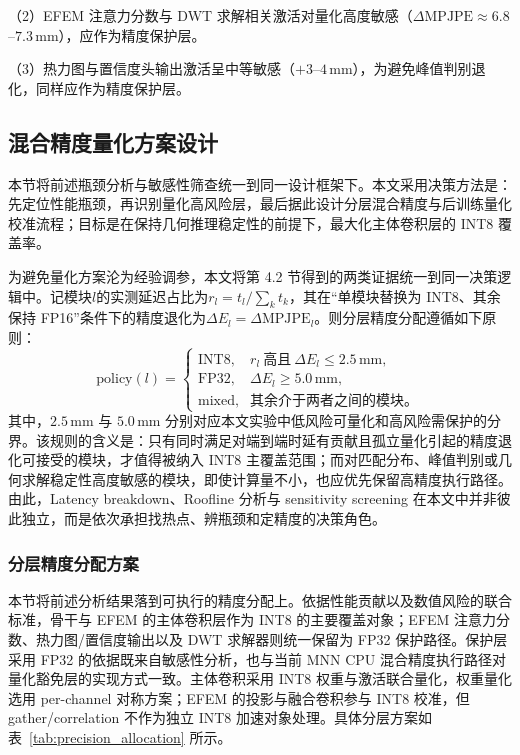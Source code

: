 （2）EFEM 注意力分数与 DWT 求解相关激活对量化高度敏感（$\Delta\text{MPJPE}\approx6.8$--$7.3$\,mm），应作为精度保护层。

（3）热力图与置信度头输出激活呈中等敏感（$+3$--$4$\,mm），为避免峰值判别退化，同样应作为精度保护层。


\subsection{混合精度量化方案设计}

本节将前述瓶颈分析与敏感性筛查统一到同一设计框架下。本文采用决策方法是：先定位性能瓶颈，再识别量化高风险层，最后据此设计分层混合精度与后训练量化校准流程；目标是在保持几何推理稳定性的前提下，最大化主体卷积层的 INT8 覆盖率。

为避免量化方案沦为经验调参，本文将第 4.2 节得到的两类证据统一到同一决策逻辑中。记模块$l$的实测延迟占比为$r_l=t_l/\sum_k t_k$，其在“单模块替换为 INT8、其余保持 FP16”条件下的精度退化为$\Delta E_l=\Delta\text{MPJPE}_l$。则分层精度分配遵循如下原则：
\begin{equation}
\text{policy}(l)=
\begin{cases}
\text{INT8}, & r_l\ \text{高且}\ \Delta E_l \le 2.5\,\text{mm},\\
\text{FP32}, & \Delta E_l \ge 5.0\,\text{mm},\\
\text{mixed}, & \text{其余介于两者之间的模块。}
\end{cases}
\label{eq:precision_policy}
\end{equation}
其中，$2.5$\,mm 与 $5.0$\,mm 分别对应本文实验中低风险可量化和高风险需保护的分界。该规则的含义是：只有同时满足对端到端时延有贡献且孤立量化引起的精度退化可接受的模块，才值得被纳入 INT8 主覆盖范围；而对匹配分布、峰值判别或几何求解稳定性高度敏感的模块，即使计算量不小，也应优先保留高精度执行路径。由此，Latency breakdown、Roofline 分析与 sensitivity screening 在本文中并非彼此独立，而是依次承担找热点、辨瓶颈和定精度的决策角色。

\subsubsection{分层精度分配方案}

本节将前述分析结果落到可执行的精度分配上。依据性能贡献以及数值风险的联合标准，骨干与 EFEM 的主体卷积层作为 INT8 的主要覆盖对象；EFEM 注意力分数、热力图/置信度输出以及 DWT 求解器则统一保留为 FP32 保护路径。保护层采用 FP32 的依据既来自敏感性分析，也与当前 MNN CPU 混合精度执行路径对量化豁免层的实现方式一致。主体卷积采用 INT8 权重与激活联合量化，权重量化选用 per-channel 对称方案；EFEM 的投影与融合卷积参与 INT8 校准，但 gather/correlation 不作为独立 INT8 加速对象处理。具体分层方案如表~\ref{tab:precision_allocation} 所示。

